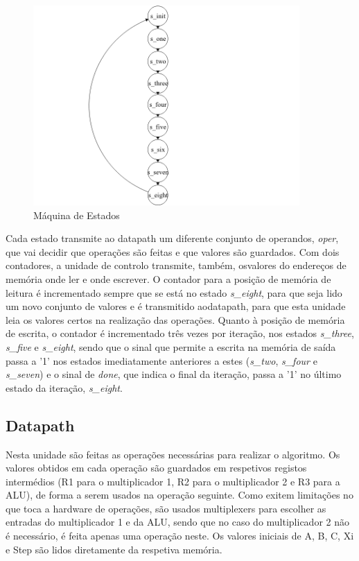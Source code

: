 \documentclass{article} %
\begin{document}
		\begin{figure}[htbp]
			\begin{center}
				\includegraphics[width = 4in]{FSM.png}
				\caption{Máquina de Estados}
				\label{fig:FSM}
			\end{center}
		\end{figure}

			\noindent Cada estado transmite ao datapath um diferente conjunto de operandos, \emph{oper}, que vai decidir que operações são feitas e que valores são guardados. Com dois contadores, a unidade de controlo transmite, também, osvalores do endereços de memória onde ler e onde escrever. O contador para a posição de memória de leitura é incrementado sempre que se está no estado \emph{s\_eight}, para que seja lido um novo conjunto de valores e é transmitido aodatapath, para que esta unidade leia os valores certos na realização das operações. Quanto à posição de memória de escrita, o contador é incrementado três vezes por iteração, nos estados \emph{s\_three}, \emph{s\_five} e \emph{s\_eight}, sendo que o sinal que permite a escrita na memória de saída passa a '1' nos estados imediatamente anteriores a estes (\emph{s\_two}, \emph{s\_four} e \emph{s\_seven}) e o sinal de \emph{done}, que indica o final da iteração, passa a '1' no último estado da iteração, \emph{s\_eight}.  


		\subsection{Datapath}
			Nesta unidade são feitas as operações necessárias para realizar o algoritmo. Os valores obtidos em cada operação são guardados em respetivos registos intermédios (R1 para o multiplicador 1, R2 para o multiplicador 2 e R3 para a ALU), de forma a serem usados na operação seguinte. Como exitem limitações no que toca a hardware de operações, são usados multiplexers para escolher as entradas do multiplicador 1 e da ALU, sendo que no caso do multiplicador 2 não é necessário, é feita apenas uma operação neste. Os valores iniciais de A, B, C, Xi e Step são lidos diretamente da respetiva memória.\\
\end{document}
